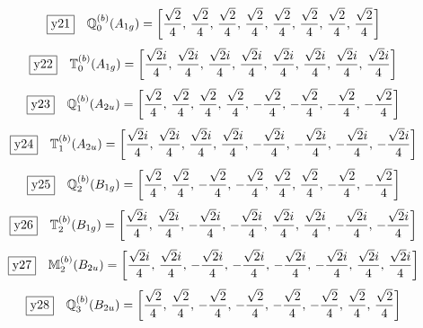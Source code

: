 \documentclass[fleqn,10pt,landscape]{jsarticle}
\begin{document}
\begin{dmath*}
\fbox{y21}\quad \mathbb{Q}_{0}^{(b)}(A_{1g})=\left[ \frac{\sqrt{2}}{4},\, \frac{\sqrt{2}}{4},\, \frac{\sqrt{2}}{4},\, \frac{\sqrt{2}}{4},\, \frac{\sqrt{2}}{4},\, \frac{\sqrt{2}}{4},\, \frac{\sqrt{2}}{4},\, \frac{\sqrt{2}}{4} \right]
\end{dmath*}
\begin{dmath*}
\fbox{y22}\quad \mathbb{T}_{0}^{(b)}(A_{1g})=\left[ \frac{\sqrt{2} i}{4},\, \frac{\sqrt{2} i}{4},\, \frac{\sqrt{2} i}{4},\, \frac{\sqrt{2} i}{4},\, \frac{\sqrt{2} i}{4},\, \frac{\sqrt{2} i}{4},\, \frac{\sqrt{2} i}{4},\, \frac{\sqrt{2} i}{4} \right]
\end{dmath*}
\begin{dmath*}
\fbox{y23}\quad \mathbb{Q}_{1}^{(b)}(A_{2u})=\left[ \frac{\sqrt{2}}{4},\, \frac{\sqrt{2}}{4},\, \frac{\sqrt{2}}{4},\, \frac{\sqrt{2}}{4},\, - \frac{\sqrt{2}}{4},\, - \frac{\sqrt{2}}{4},\, - \frac{\sqrt{2}}{4},\, - \frac{\sqrt{2}}{4} \right]
\end{dmath*}
\begin{dmath*}
\fbox{y24}\quad \mathbb{T}_{1}^{(b)}(A_{2u})=\left[ \frac{\sqrt{2} i}{4},\, \frac{\sqrt{2} i}{4},\, \frac{\sqrt{2} i}{4},\, \frac{\sqrt{2} i}{4},\, - \frac{\sqrt{2} i}{4},\, - \frac{\sqrt{2} i}{4},\, - \frac{\sqrt{2} i}{4},\, - \frac{\sqrt{2} i}{4} \right]
\end{dmath*}
\begin{dmath*}
\fbox{y25}\quad \mathbb{Q}_{2}^{(b)}(B_{1g})=\left[ \frac{\sqrt{2}}{4},\, \frac{\sqrt{2}}{4},\, - \frac{\sqrt{2}}{4},\, - \frac{\sqrt{2}}{4},\, \frac{\sqrt{2}}{4},\, \frac{\sqrt{2}}{4},\, - \frac{\sqrt{2}}{4},\, - \frac{\sqrt{2}}{4} \right]
\end{dmath*}
\begin{dmath*}
\fbox{y26}\quad \mathbb{T}_{2}^{(b)}(B_{1g})=\left[ \frac{\sqrt{2} i}{4},\, \frac{\sqrt{2} i}{4},\, - \frac{\sqrt{2} i}{4},\, - \frac{\sqrt{2} i}{4},\, \frac{\sqrt{2} i}{4},\, \frac{\sqrt{2} i}{4},\, - \frac{\sqrt{2} i}{4},\, - \frac{\sqrt{2} i}{4} \right]
\end{dmath*}
\begin{dmath*}
\fbox{y27}\quad \mathbb{M}_{2}^{(b)}(B_{2u})=\left[ \frac{\sqrt{2} i}{4},\, \frac{\sqrt{2} i}{4},\, - \frac{\sqrt{2} i}{4},\, - \frac{\sqrt{2} i}{4},\, - \frac{\sqrt{2} i}{4},\, - \frac{\sqrt{2} i}{4},\, \frac{\sqrt{2} i}{4},\, \frac{\sqrt{2} i}{4} \right]
\end{dmath*}
\begin{dmath*}
\fbox{y28}\quad \mathbb{Q}_{3}^{(b)}(B_{2u})=\left[ \frac{\sqrt{2}}{4},\, \frac{\sqrt{2}}{4},\, - \frac{\sqrt{2}}{4},\, - \frac{\sqrt{2}}{4},\, - \frac{\sqrt{2}}{4},\, - \frac{\sqrt{2}}{4},\, \frac{\sqrt{2}}{4},\, \frac{\sqrt{2}}{4} \right]
\end{dmath*}
\end{document}
